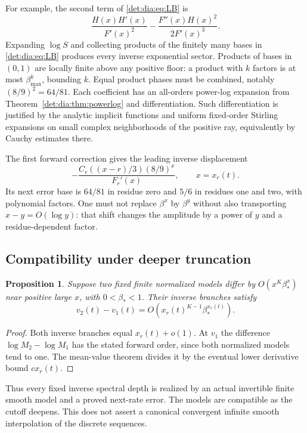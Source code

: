 \documentclass[11pt,letterpaper]{article}
\numberwithin{equation}{section}
\newtheorem{proposition}[theorem]{Proposition}
\theoremstyle{definition}\newtheorem{definition}[theorem]{Definition}
\theoremstyle{remark}\newtheorem{remark}[theorem]{Remark}
\begin{document}
For example, the second term of \eqref{det:dia:eq:LB} is
\begin{equation}\label{det:dia:eq:secondinverse}
 \frac{H(x)H'(x)}{F'(x)^2}
 -\frac{F''(x)H(x)^2}{2F'(x)^3}.
\end{equation}
Expanding $\log S$ and collecting products of the finitely many bases
in \eqref{det:dia:eq:LB} produces every inverse exponential sector. Products
of bases in $(0,1)$ are locally finite above any positive floor: a
product with $k$ factors is at most $\beta_{\max}^k$, bounding $k$.
Equal product phases must be combined, notably
$(8/9)^2=64/81$. Each coefficient has an all-orders power-log
expansion from Theorem~\ref{det:dia:thm:powerlog} and differentiation. Such
differentiation is justified by the analytic implicit functions and
uniform fixed-order Stirling expansions on small complex neighborhoods
of the positive ray, equivalently by Cauchy estimates there.

The first forward correction gives the leading inverse displacement
\begin{equation}\label{det:dia:eq:firstinverse}
 -\frac{C_r((x-r)/3)(8/9)^x}{F_r'(x)},\qquad x=x_r(t).
\end{equation}
Its next error base is $64/81$ in residue zero and $5/6$ in residues
one and two, with polynomial factors. One must not replace $\beta^x$
by $\beta^y$ without also transporting $x-y=O(\log y)$: that shift
changes the amplitude by a power of $y$ and a residue-dependent factor.

\subsection{Compatibility under deeper truncation}
\begin{proposition}\label{det:dia:prop:compatibility}
Suppose two fixed finite normalized models differ by
$O(x^K\beta_*^x)$ near positive large $x$, with $0<\beta_*<1$.
Their inverse branches satisfy
\begin{equation}\label{det:dia:eq:compatibility}
 v_2(t)-v_1(t)=O\left(x_r(t)^{K-1}\beta_*^{x_r(t)}\right).
\end{equation}
\end{proposition}
\begin{proof}
Both inverse branches equal $x_r(t)+o(1)$. At $v_1$ the difference
$\log M_2-\log M_1$ has the stated forward order, since both normalized
models tend to one. The mean-value theorem divides it by the eventual
lower derivative bound $c x_r(t)$.
\end{proof}
Thus every fixed inverse spectral depth is realized by an actual
invertible finite smooth model and a proved next-rate error. The models
are compatible as the cutoff deepens. This does not assert a canonical
convergent infinite smooth interpolation of the discrete sequences.
\end{document}
